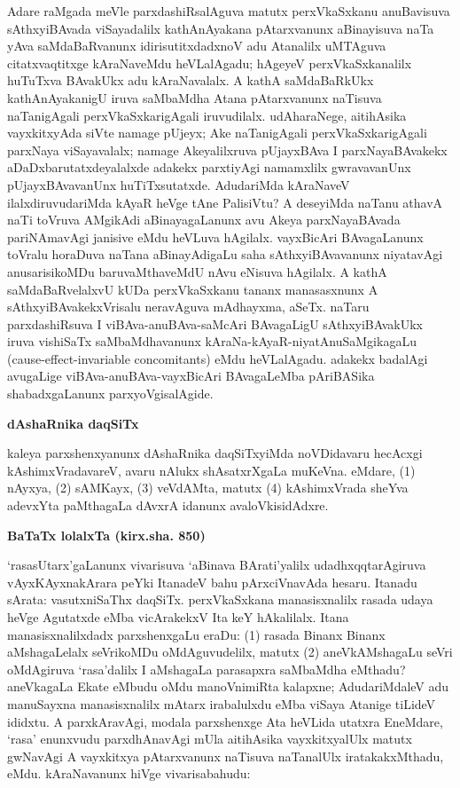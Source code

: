 Adare raMgada meVle parxdashiRsalAguva matutx perxVkaSxkanu anuBavisuva sAthxyi\-BAvada viSayadalilx kathAnAyakana pAtarxvanunx aBinayisuva naTa yAva saMdaBaR\-vanunx idirisutitxdadxnoV adu Atanalilx uMTAguva citatxvaqtitxge kAraNaveMdu heVLa\-lAgadu; hAgeyeV perxVkaSxkanalilx huTuTxva BAvakUkx adu kAraNavalalx. A kathA saMda\-BaRkUkx kathAnAyakanigU iruva saMbaMdha Atana pAtarxvanunx naTisuva naTanigAgali perxVkaSxkarigAgali iruvudilalx. udAharaNege, aitihAsika vayxkitxyAda siVte namage pUjeyx; Ake naTanigAgali perxVkaSxkarigAgali parxNaya viSayavalalx; namage Akeyalilxruva pUjayxBAva I parxNayaBAvakekx aDaDxbarutatxdeyalalxde adakekx parxtiyAgi namamxlilx gwrava\-vanUnx pUjayxBAvavanUnx huTiTxsutatxde. AdudariMda kAraNaveV ilalxdiruvudariMda kAyaR heVge tAne PalisiVtu? A deseyiMda naTanu athavA naTi toVruva AMgikAdi aBinayagaLanunx avu Akeya parxNayaBAvada pariNAma\-vAgi janisive eMdu heVLuva hAgilalx. vayxBicAri BAvagaLanunx toVralu \hbox{horaDuva} naTana aBinayAdigaLu saha sAthxyiBAvavanunx niyatavAgi anusarisikoMDu baruvaMthaveMdU nAvu eNisuva hAgilalx. A kathA saMdaBaRvelalxvU kUDa perxVkaSxkanu tananx manasasxnunx A sAthxyiBAvakekxVri\-salu neravAguva mAdhayxma, aSeTx. naTaru parxdashiRsuva I viBAva-anuBAva-\hbox{saMcAri} BAvagaLigU sAthxyi\-BAvakUkx iruva vishiSaTx saMbaMdhavanunx kAraNa-kAyaR-niya\-tAnu\-SaMgikagaLu {\rm(cause-effect-invariable concomitants)} eMdu heVLalAgadu. adakekx badalAgi avugaLige viBAva-anuBAva-vayxBicAri BAvagaLeMba pAriBASika shabadxgaLanunx parxyoVgisalAgide.

\smallskip
\begin{center}
{\Large\bf dAshaRnika daqSiTx}
\end{center}

kaleya parxshenxyanunx dAshaRnika daqSiTxyiMda noVDidavaru hecAcxgi kAshimxVradavareV, avaru nAlukx shAsatxrXgaLa muKeVna. eMdare, (1) nAyxya, (2) sAMKayx, (3) veVdAMta, matutx (4) kAshimxVrada sheYva adevxYta paMthagaLa dAvxrA idanunx avaloVkisidAdxre.

\smallskip
\begin{center}
{\Large\bf BaTaTx lolalxTa (kirx.sha. 850)}
\end{center}

`rasasUtarx'gaLanunx vivarisuva `aBinava BArati'yalilx udadhxqqtarAgiruva vAyxKAyxna\-kArara peYki ItanadeV bahu pArxciVnavAda hesaru. Itanadu sArata: vasutxniSaThx daqSiTx. perxVkaSxkana manasisxnalilx rasada udaya heVge Agutatxde eMba vicArakekxV Ita keY hAkalilalx. Itana manasisxnalilxdadx parxshenxgaLu eraDu: (1) rasada Binanx Binanx aMshagaLelalx seVrikoMDu oMdAguvudelilx, matutx (2) aneVkAMshagaLu seVri oMdAgiruva `rasa'dalilx I aMshagaLa parasapxra saMbaMdha eMthadu? aneVkagaLa Ekate eMbudu oMdu manoVnimiRta kalapxne; AdudariMdaleV adu manuSayxna manasisxnalilx mAtarx irabalulxdu eMba viSaya Atanige tiLideV ididxtu. A parxkAravAgi, modala parxshenxge Ata heVLida utatxra EneMdare, `rasa' enunxvudu parxdhAnavAgi mUla aitihAsika vayxkitxyalUlx matutx gwNavAgi A vayxkitxya pAtarxvanunx naTisuva naTanalUlx iratakakxMthadu, eMdu. kAraNavanunx hiVge vivarisabahudu:

